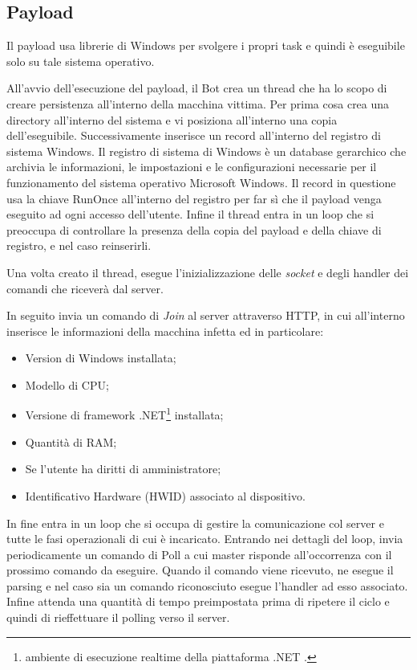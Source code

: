 \subsection{Payload}
\label{Uboat-dettagli-payload}
Il payload usa librerie di Windows per svolgere i propri task e quindi è eseguibile solo su tale sistema operativo.

All'avvio dell'esecuzione del payload, il Bot crea un thread che ha lo scopo di creare persistenza all'interno della macchina vittima.  Per prima cosa crea una directory all'interno del sistema e vi posiziona all'interno una copia dell'eseguibile. Successivamente inserisce un record all'interno del registro di sistema Windows.
Il registro di sistema di Windows è un database gerarchico che archivia le informazioni, le impostazioni e le configurazioni necessarie per il funzionamento  del sistema operativo Microsoft Windows.
Il record in questione usa la chiave RunOnce all'interno del registro per far sì che il payload venga eseguito ad ogni accesso dell'utente. Infine il thread entra in un loop che si preoccupa di controllare la presenza della copia del payload e della chiave di registro, e nel caso reinserirli.

Una  volta creato il thread, esegue l'inizializzazione delle \textit{socket} e degli handler dei comandi che riceverà dal server.

In seguito invia un comando di \textit{Join} al server attraverso HTTP, in cui all'interno inserisce le informazioni della macchina infetta ed in particolare:
\begin{itemize}
    \item Version di Windows installata;
    \item Modello di CPU;
    \item Versione di framework .NET\footnote{ambiente di esecuzione realtime della piattaforma .NET \cite{netframework}.} installata;
    \item Quantità di RAM;
    \item Se l'utente ha diritti di amministratore;
    \item Identificativo Hardware (HWID) associato al dispositivo.
\end{itemize}
In fine entra in un loop che si occupa di gestire la comunicazione col server e tutte le fasi operazionali di cui è incaricato.
Entrando nei dettagli del loop, invia periodicamente un comando di Poll  a cui master risponde all'occorrenza con il prossimo comando da eseguire. Quando il comando viene ricevuto, ne esegue il parsing e nel caso sia un comando riconosciuto esegue l'handler ad esso associato. Infine attenda una quantità di tempo preimpostata prima di ripetere il ciclo e quindi di rieffettuare il polling verso il server.

